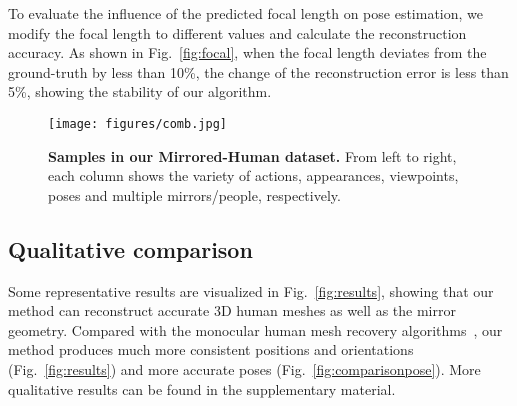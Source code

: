To evaluate the influence of the predicted focal length on pose estimation, we modify the focal length to different values and calculate the reconstruction accuracy. As shown in Fig.~\ref{fig:focal}, when the focal length deviates from the ground-truth by less than 10\%, the change of the reconstruction error is less than 5\%, showing the stability of our algorithm.
\begin{figure}[t]
	\centering
	\texttt{[image: figures/comb.jpg]}
	\caption{\textbf{Samples in our Mirrored-Human dataset.} From left to right, each column shows the variety of actions, appearances, viewpoints, poses and multiple mirrors/people, respectively. }
	\label{fig:dataset}
\end{figure}


\subsection{Qualitative comparison}
Some representative results are visualized in Fig.~\ref{fig:results}, showing that our method can reconstruct accurate 3D human meshes as well as the mirror geometry. 
Compared with the monocular human mesh recovery algorithms~\cite{SMPL-X:2019, kolotouros2019spin}, our method produces much more consistent positions and orientations  (Fig.~\ref{fig:results}) and more accurate poses (Fig.~\ref{fig:comparisonpose}). More qualitative results can be found in the supplementary material.
